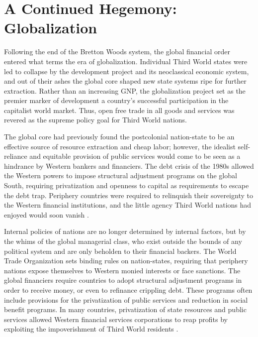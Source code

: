 \documentclass[american]{../../../coursework}
\begin{document}
\section{A Continued Hegemony: Globalization}

Following the end of the Bretton Woods system, the global financial order
entered what \textcite{McMichael2004} terms the era of globalization.
Individual Third World states were led to collapse by the development project
and its neoclassical economic system, and out of their ashes the global core
shaped new state systems ripe for further extraction. Rather than an
increasing GNP, the globalization project set as the premier marker of
development a country's successful participation in the capitalist world
market. Thus, open free trade in all goods and services was revered as the
supreme policy goal for Third World nations.

The global core had previously found the postcolonial nation-state to be an
effective source of resource extraction and cheap labor; however, the idealist
self-reliance and equitable provision of public services would come to be seen
as a hindrance by Western bankers and financiers. The debt crisis of the 1980s
allowed the Western powers to impose structural adjustment programs on the
global South, requiring privatization and openness to capital as requirements
to escape the debt trap. Periphery countries were required to relinquish their
sovereignty to the Western financial institutions, and the little agency Third
World nations had enjoyed would soon vanish \parencite{McMichael2004}.

Internal policies of nations are no longer determined by internal factors, but
by the whims of the global managerial class, who exist outside the bounds of
any political system and are only beholden to their financial backers. The
World Trade Organization sets binding rules on nation-states, requiring that
periphery nations expose themselves to Western monied interests or face
sanctions. The global financiers require countries to adopt structural
adjustment programs in order to receive money, or even to refinance crippling
debt. These programs often include provisions for the privatization of public
services and reduction in social benefit programs. In many countries,
privatization of state resources and public services allowed Western financial
services corporations to reap profits by exploiting the impoverishment of
Third World residents \parencite{McMichael2004}.
\end{document}
